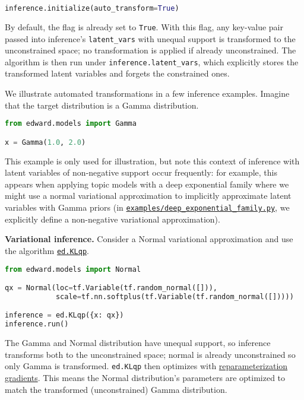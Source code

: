 \begin{lstlisting}[language=Python]
inference.initialize(auto_transform=True)
\end{lstlisting}

By default, the flag is already set to \texttt{True}.
With this flag, any key-value pair passed into inference's
\texttt{latent_vars} with unequal support is transformed to the
unconstrained space; no transformation is applied if already
unconstrained. The algorithm is then run under
\texttt{inference.latent_vars}, which explicitly stores the
transformed latent variables and forgets the constrained ones.

We illustrate automated transformations in a few inference examples.
Imagine that the target distribution is a Gamma distribution.

\begin{lstlisting}[language=Python]
from edward.models import Gamma

x = Gamma(1.0, 2.0)
\end{lstlisting}

This example is only used for illustration, but note this context of
inference with latent variables of non-negative support occur
frequently: for example, this appears when applying topic models with a deep exponential
family where we might use a normal variational
approximation to implicitly approximate latent variables with Gamma
priors (in
\href{https://github.com/blei-lab/edward/blob/master/examples/deep_exponential_family.py}
{\texttt{examples/deep_exponential_family.py}},
we explicitly define a non-negative variational approximation).

\textbf{Variational inference.}
Consider a Normal variational approximation
and use the algorithm \href{/api/ed/KLqp}{\texttt{ed.KLqp}}.

\begin{lstlisting}[language=Python]
from edward.models import Normal

qx = Normal(loc=tf.Variable(tf.random_normal([])),
            scale=tf.nn.softplus(tf.Variable(tf.random_normal([]))))

inference = ed.KLqp({x: qx})
inference.run()
\end{lstlisting}

The Gamma and Normal distribution have unequal support, so inference
transforms both to the unconstrained space; normal is already
unconstrained so only Gamma is transformed. \texttt{ed.KLqp} then
optimizes with
\href{/api/klqp}{reparameterization gradients}.
This means the Normal distribution's parameters are optimized to match
the transformed (unconstrained) Gamma distribution.

